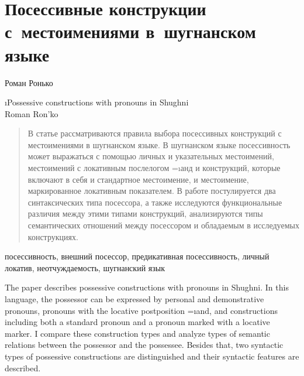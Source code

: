 \chapter*{Посессивные конструкции с~местоимениями в~шугнанском языке}
\setcounter{section}{0}
\label{chapter-ronko-poss}

\begin{customauthorname}
Роман Ронько
\end{customauthorname}

\begin{englishtitle}
\i{Possessive constructions with pronouns in Shughni\\{\small Roman Ron’ko}}
\end{englishtitle}

\begin{abstract}
В статье рассматриваются правила выбора посессивных конструкций с местоимениями в шугнанском языке. В шугнанском языке посессивность может выражаться с помощью личных и указательных местоимений, местоимений с локативным послелогом =\i{анд} и конструкций, которые включают в себя и стандартное местоимение, и местоимение, маркированное локативным показателем. В работе постулируется два синтаксических типа посессора, а также исследуются функциональные различия между этими типами конструкций, анализируются типы семантических отношений между посессором и обладаемым в исследуемых конструкциях.
\end{abstract}

\begin{keywords}
посессивность, внешний посессор, предикативная посессивность, личный локатив, неотчуждаемость, шугнанский язык
\end{keywords}

\begin{eng-abstract}
The paper describes possessive constructions with pronouns in Shughni. In this language, the possessor can be expressed by personal and demonstrative pronouns, pronouns with the locative postposition =\i{and}, and constructions including both a standard pronoun and a pronoun marked with a locative marker. I compare these construction types and analyze types of semantic relations between the possessor and the possessee. Besides that, two syntactic types of possessive constructions are distinguished and their syntactic features are described.
\end{eng-abstract}

